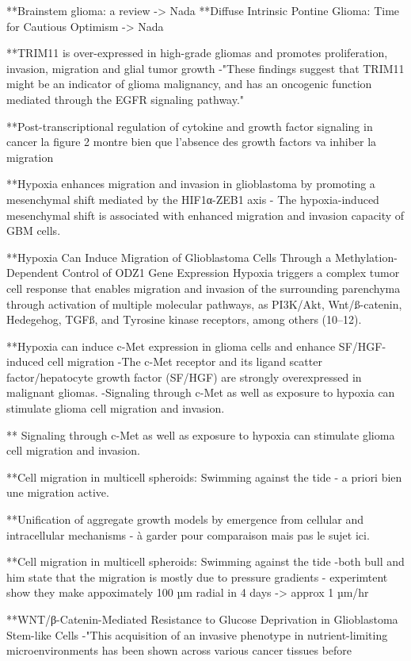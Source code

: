 \documentclass[11pt,a4paper]{article}
\begin{document}
**Brainstem glioma: a review -> Nada
**Diffuse Intrinsic Pontine Glioma: Time for Cautious Optimism -> Nada

**TRIM11 is over-expressed in high-grade gliomas and promotes proliferation, invasion, migration and glial tumor growth
 -"These findings suggest that TRIM11 might be an indicator of glioma malignancy, and has an oncogenic function mediated through the EGFR signaling pathway."
 
**Post-transcriptional regulation of cytokine and growth factor signaling in cancer
la figure 2 montre bien que l'absence des growth factors va inhiber la migration

**Hypoxia enhances migration and invasion in glioblastoma by promoting a mesenchymal shift mediated by the HIF1α-ZEB1 axis
- The hypoxia-induced mesenchymal shift is associated with enhanced migration and invasion capacity of GBM cells.

**Hypoxia Can Induce Migration of Glioblastoma Cells Through a Methylation-Dependent Control of ODZ1 Gene Expression
Hypoxia triggers a complex tumor cell response that enables migration and invasion of the surrounding parenchyma through activation of multiple molecular pathways, as PI3K/Akt, Wnt/ß-catenin, Hedegehog, TGFß, and Tyrosine kinase receptors, among others (10–12).

**Hypoxia can induce c-Met expression in glioma cells and enhance
SF/HGF-induced cell migration
-The c-Met receptor and its ligand scatter factor/hepatocyte
growth factor (SF/HGF) are strongly overexpressed in malignant
gliomas.
-Signaling through c-Met as well as exposure to hypoxia
can stimulate glioma cell migration and invasion.

** Signaling through c-Met as well as exposure to hypoxia
can stimulate glioma cell migration and invasion.

**Cell migration in multicell spheroids: Swimming against the tide
- a priori bien une migration active.

**Unification of aggregate growth models by emergence from cellular and intracellular mechanisms 
- à garder pour comparaison mais pas le sujet ici.

**Cell migration in multicell spheroids: Swimming against the tide
-both bull and him state that the migration is mostly due to pressure gradients
- experimtent show they make appoximately 100 µm radial in 4 days -> approx 1 µm/hr

**WNT/β-Catenin-Mediated Resistance to Glucose Deprivation in Glioblastoma Stem-like Cells
-"This acquisition of an invasive phenotype in nutrient-limiting microenvironments has been shown across various cancer tissues before
\end{document}
